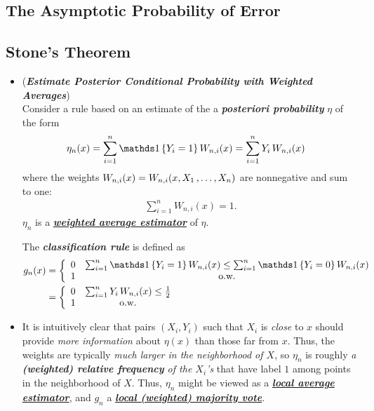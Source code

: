 \documentclass[11pt]{article}
\begin{document}
\subsection{The Asymptotic Probability of Error}

\subsection{Stone's Theorem}
\begin{itemize}
\item \begin{remark} (\emph{\textbf{Estimate Posterior Conditional Probability with Weighted Averages}})\\
Consider a rule based on an estimate of the a \emph{\textbf{posteriori probability}} $\eta$ of the form
\begin{align*}
\eta_n(x) &= \sum_{i=1}^{n}\ind{Y_i = 1}W_{n,i}(x) = \sum_{i=1}^{n}Y_i \,W_{n,i}(x)
\end{align*}
where the weights $W_{n,i}(x) = W_{n,i}(x, X_1 \,{,}\ldots{,}\, X_n)$ are nonnegative and sum to one:
\begin{align*}
\sum_{i=1}^{n}W_{n,i}(x)  = 1.
\end{align*} $\eta_n$ is a \underline{\emph{\textbf{weighted average estimator}}} of $\eta$. 

The \emph{\textbf{classification rule}} is defined as
\begin{align*}
g_n(x) &= \left\{\begin{array}{cc}
0 &  \sum_{i=1}^{n}\ind{Y_i = 1}W_{n,i}(x)  \le \sum_{i=1}^{n}\ind{Y_i = 0}W_{n,i}(x)  \\
1 & \text{o.w.}
\end{array}
\right. \\
&=  \left\{\begin{array}{cc}
0 &   \sum_{i=1}^{n}Y_i \,W_{n,i}(x) \le \frac{1}{2}  \\
1 & \text{o.w.}
\end{array}
\right.
\end{align*}
\end{remark}

\item \begin{remark}
It is intuitively clear that pairs $(X_i, Y_i)$ such that $X_i$ is \emph{close} to $x$ should provide \emph{more information} about $\eta(x)$ than those far from $x$. Thus, the weights are typically \emph{much larger in the neighborhood of $X$}, so $\eta_n$ is roughly \emph{a \textbf{(weighted) relative frequency} of the $X_i$'s} that have label $1$ among points in the neighborhood of $X$. Thus, $\eta_n$ might be viewed as a \emph{\textbf{\underline{local average estimator}}}, and $g_n$ a \emph{\textbf{\underline{local (weighted) majority vote}}}.
\end{remark}


\end{itemize}
\end{document}
